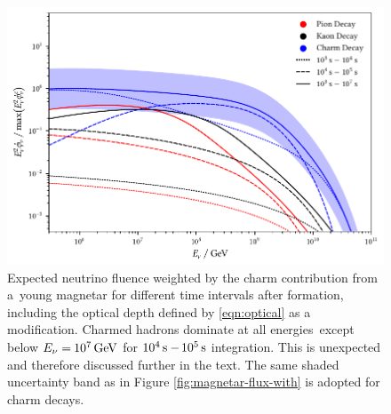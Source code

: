 \begin{figure}[H]
	\centering
	\includegraphics{../plots/build/magnetar_integrated_neutrino_spectrum_with.pdf}
	\caption[Magnetar $\nu \kern+0.5pt$ fluence compared to $c$ decay with optical depth.]
			{Expected neutrino fluence weighted by the charm contribution from a~young magnetar for different time
			 intervals after formation, including the optical depth defined by \eqref{eqn:optical} as a modification.
			 Charmed hadrons dominate at all energies~except below $E_\nu = \kern-0.5pt \qty{e7}{\giga\electronvolt}$ for
			 $\qty{e4}{\second} - \kern-1.0pt \qty{e5}{\second}$ integration. This is unexpected and therefore discussed further
			 in the text. The same shaded uncertainty band as in Figure \ref{fig:magnetar-flux-with} is adopted for charm decays.}
	\label{fig:magnetar-fluence-with}
\end{figure}
